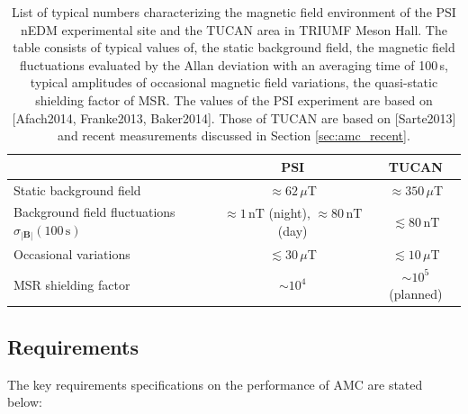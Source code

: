 \begin{table}[tb!]
\centering 
\begin{tabular}{|l||c|c|}
\hline

 & \multicolumn{1}{c|}{\textbf{PSI}} & \multicolumn{1}{c|}{\textbf{TUCAN}} \\ \hline\hline 
Static background field & $\approx62\,\mu$T & $\approx 350\,\mu$T            \\ \hline
Background field fluctuations $\sigma_{|\mathbf{B}|}(100\,\mathrm{s})$ & $\approx 1\,\mathrm{nT}$ (night), $\approx 80\,\mathrm{nT}$ (day) & $\lesssim 80\,\mathrm{nT}$ \\ \hline
Occasional variations  & $\lesssim30\,\mu$T  & $\lesssim 10\,\mu$T      \\ \hline
 MSR shielding factor    &  $\sim 10^4$  &  $\sim 10^5$ (planned) \\ \hline 
\end{tabular}
\caption{List of typical numbers characterizing the magnetic field environment of the PSI nEDM experimental site and the TUCAN area in TRIUMF Meson Hall. The table consists of typical values of, the static background field, the magnetic field fluctuations evaluated by the Allan deviation with an averaging time of 100\,s, typical amplitudes of occasional magnetic field variations, the quasi-static shielding factor of MSR. The values of the PSI experiment are based on [Afach2014, Franke2013, Baker2014]. Those of TUCAN are based on [Sarte2013] and recent measurements discussed in Section \ref{sec:amc_recent}. 
}
\label{tab:amc_comparaion}
\end{table}


\subsection{Requirements}
The key requirements specifications on the performance of AMC are stated below:

